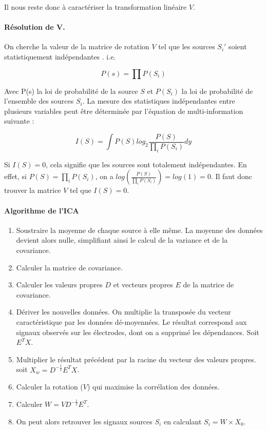 Il nous reste donc à caractériser la transformation linéaire $V$.
 
\paragraph{Résolution de V.} On cherche la valeur de la matrice de rotation $V$ tel que les sources $S_i'$ soient statistiquement indépendantes \cite{ICA}. i.e. 

\begin{equation}
	P(s) = \prod P(S_i)
\end{equation}

Avec P(s) la loi de probabilité de la source $S$ et $P(S_i)$ la loi de probabilité de l'ensemble des sources $S_i$.
La mesure des statistiques indépendantes entre plusieurs variables peut être déterminée par l'équation de multi-information suivante :

\begin{equation}
	I(S) = \int{P(S)log_2 \frac{P(S)}{\prod_iP(S_i)}dy}
\end{equation}

Si $I(S) = 0$, cela signifie que les sources sont totalement indépendantes. En effet, si $P(S) = \prod_i P(S_i)$, on a $log(\frac{P(S)}{\prod_iP(S_i)}) = log(1) = 0$. Il faut donc trouver la matrice $V$ tel que $I(S) = 0$.

\paragraph{Algorithme de l'ICA} \cite{ICA}
\smallbreak
\begin{enumerate}
	\item Soustraire la moyenne de chaque source à elle même. La moyenne des données devient alors nulle, simplifiant ainsi le calcul de la variance et de la covariance.
	\item Calculer la matrice de covariance. 
	\item Calculer les valeurs propres $D$ et vecteurs propres $E$ de la matrice de covariance.
	\item Dériver les nouvelles données. On multiplie la transposée du vecteur caractéristique par les données dé-moyennées. Le résultat correspond aux signaux observés sur les électrodes, dont on a supprimé les dépendances. Soit $E^TX$.
	\item Multiplier le résultat précédent par la racine du vecteur des valeurs propres. soit $X_w = D^{-\frac{1}{2}}E^TX$.
	\item Calculer la rotation ($V$) qui maximise la corrélation des données. 
	\item Calculer $W = VD^{-\frac{1}{2}}E^T$.
	\item On peut alors retrouver les signaux sources $S_i$ en calculant $S_i = W \times X_0$.
\end{enumerate}

